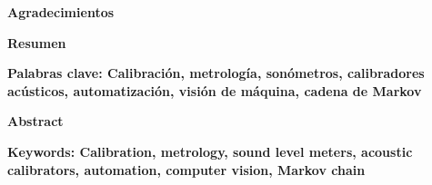 \newpage{\pagestyle{empty}\cleardoublepage}

\newpage
\thispagestyle{empty}\normalsize \vspace*{3cm}

\begin{flushright}
\begin{minipage}{8cm}
	\setlength{\parskip}{2em}  %
    \noindent
        \small
        \lipsum[1]
        
        \lipsum[1][1]
\end{minipage}
\end{flushright}

\newpage{\pagestyle{empty}\cleardoublepage}

\newpage
\thispagestyle{empty}\normalsize \vspace*{3cm}

\textbf{\LARGE Agradecimientos} \vspace{2em}

\lipsum[2]
\newpage{\pagestyle{empty}\cleardoublepage}

\newpage
\textbf{\LARGE Resumen} \vspace{2em}

\lipsum[1]

\textbf{\small Palabras clave: Calibración, metrología, sonómetros, calibradores acústicos, automatización,
		visión de máquina, cadena de Markov} \vspace{2em}

\textbf{\LARGE Abstract} \vspace{2em}

\lipsum[1]

\textbf{\small Keywords: Calibration, metrology, sound level meters, acoustic calibrators, automation,
		computer vision, Markov chain}